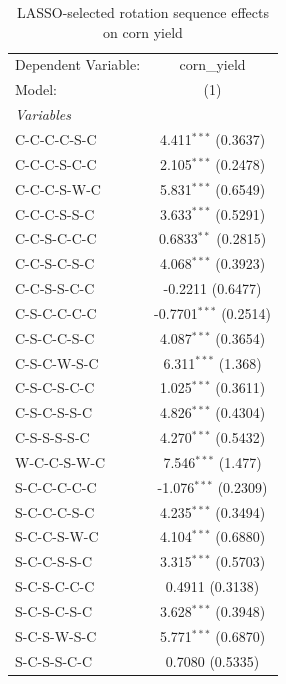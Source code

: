
\begin{table}[htbp]
   \caption{\label{tab:corn_lasso} LASSO-selected rotation sequence effects on corn yield}
   \centering
   \begin{tabular}{lc}
      \tabularnewline \midrule \midrule
      Dependent Variable: & corn\_yield\\   
      Model:              & (1)\\  
      \midrule
      \emph{Variables}\\
      C-C-C-C-S-C         & 4.411$^{***}$ (0.3637)\\   
      C-C-C-S-C-C         & 2.105$^{***}$ (0.2478)\\   
      C-C-C-S-W-C         & 5.831$^{***}$ (0.6549)\\   
      C-C-C-S-S-C         & 3.633$^{***}$ (0.5291)\\   
      C-C-S-C-C-C         & 0.6833$^{**}$ (0.2815)\\   
      C-C-S-C-S-C         & 4.068$^{***}$ (0.3923)\\   
      C-C-S-S-C-C         & -0.2211 (0.6477)\\   
      C-S-C-C-C-C         & -0.7701$^{***}$ (0.2514)\\   
      C-S-C-C-S-C         & 4.087$^{***}$ (0.3654)\\   
      C-S-C-W-S-C         & 6.311$^{***}$ (1.368)\\   
      C-S-C-S-C-C         & 1.025$^{***}$ (0.3611)\\   
      C-S-C-S-S-C         & 4.826$^{***}$ (0.4304)\\   
      C-S-S-S-S-C         & 4.270$^{***}$ (0.5432)\\   
      W-C-C-S-W-C         & 7.546$^{***}$ (1.477)\\   
      S-C-C-C-C-C         & -1.076$^{***}$ (0.2309)\\   
      S-C-C-C-S-C         & 4.235$^{***}$ (0.3494)\\   
      S-C-C-S-W-C         & 4.104$^{***}$ (0.6880)\\   
      S-C-C-S-S-C         & 3.315$^{***}$ (0.5703)\\   
      S-C-S-C-C-C         & 0.4911 (0.3138)\\   
      S-C-S-C-S-C         & 3.628$^{***}$ (0.3948)\\   
      S-C-S-W-S-C         & 5.771$^{***}$ (0.6870)\\   
      S-C-S-S-C-C         & 0.7080 (0.5335)\\   

\end{tabular}
\end{table}
